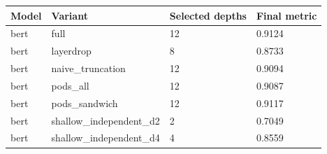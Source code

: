 \begin{tabular}{llll}
\hline
Model & Variant & Selected depths & Final metric \\
\hline
bert & full & 12 & 0.9124 \\
bert & layerdrop & 8 & 0.8733 \\
bert & naive\_truncation & 12 & 0.9094 \\
bert & pods\_all & 12 & 0.9087 \\
bert & pods\_sandwich & 12 & 0.9117 \\
bert & shallow\_independent\_d2 & 2 & 0.7049 \\
bert & shallow\_independent\_d4 & 4 & 0.8559 \\
\hline
\end{tabular}
